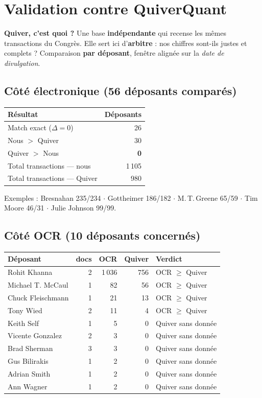 \documentclass[11pt,a4paper]{article}
\begin{document}
\section{Validation contre QuiverQuant}

\textbf{Quiver, c'est quoi ?} Une base \textbf{indépendante} qui recense les mêmes transactions du
Congrès. Elle sert ici d'\textbf{arbitre} : nos chiffres sont-ils justes et complets ? Comparaison
\textbf{par déposant}, fenêtre alignée sur la \emph{date de divulgation}.

\subsection*{Côté électronique (56 déposants comparés)}
\begin{center}
\begin{tabular}{@{}l r@{}}
\toprule
\textbf{Résultat} & \textbf{Déposants} \\
\midrule
Match exact ($\Delta = 0$) & 26 \\
Nous $>$ Quiver & 30 \\
Quiver $>$ Nous & \textcolor{okgreen}{\textbf{0}} \\
\midrule
Total transactions --- nous & 1\,105 \\
Total transactions --- Quiver & 980 \\
\bottomrule
\end{tabular}
\end{center}
\noindent Exemples : Bresnahan 235/234 $\cdot$ Gottheimer 186/182 $\cdot$
M.\,T.\,Greene 65/59 $\cdot$ Tim Moore 46/31 $\cdot$ Julie Johnson 99/99.

\subsection*{Côté OCR (10 déposants concernés)}
\begin{center}
\begin{tabular}{@{}l r r r l@{}}
\toprule
\textbf{Déposant} & \textbf{docs} & \textbf{OCR} & \textbf{Quiver} & \textbf{Verdict} \\
\midrule
Rohit Khanna & 2 & 1\,036 & 756 & OCR $\ge$ Quiver \\
Michael T. McCaul & 1 & 82 & 56 & OCR $\ge$ Quiver \\
Chuck Fleischmann & 1 & 21 & 13 & OCR $\ge$ Quiver \\
Tony Wied & 2 & 11 & 4 & OCR $\ge$ Quiver \\
Keith Self & 1 & 5 & 0 & Quiver sans donnée \\
Vicente Gonzalez & 2 & 3 & 0 & Quiver sans donnée \\
Brad Sherman & 3 & 3 & 0 & Quiver sans donnée \\
Gus Bilirakis & 1 & 2 & 0 & Quiver sans donnée \\
Adrian Smith & 1 & 2 & 0 & Quiver sans donnée \\
Ann Wagner & 1 & 2 & 0 & Quiver sans donnée \\
\bottomrule
\end{tabular}
\end{center}
\end{document}
